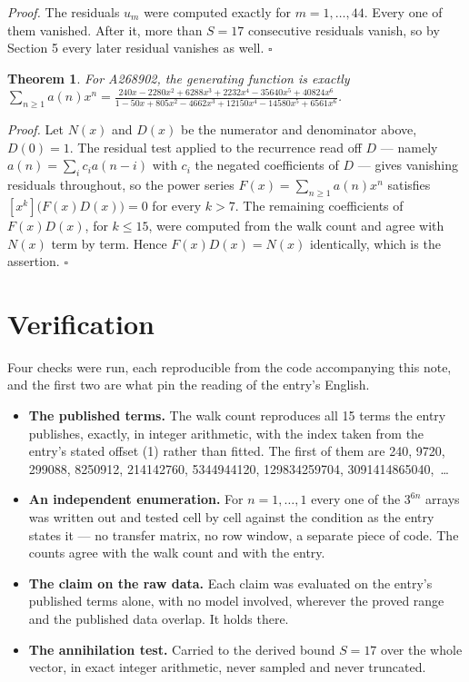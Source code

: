 \documentclass[11pt]{article}
\newtheorem{theorem}{Theorem}
\theoremstyle{definition}
\begin{document}
{\itshape Proof.} The residuals $u_m$ were computed exactly for $m = 1,\dots,44$. Every one of them vanished. After it, more than $S = 17$ consecutive residuals vanish, so by Section 5 every later residual vanishes as well. $\square$

\begin{theorem} For A268902, the generating function is exactly $\sum_{n\ge 1} a(n)x^n = \frac{240x - 2280x^{2} + 6288x^{3} + 2232x^{4} - 35640x^{5} + 40824x^{6}}{1 - 50x + 805x^{2} - 4662x^{3} + 12150x^{4} - 14580x^{5} + 6561x^{6}}$.\end{theorem}

{\itshape Proof.} Let $N(x)$ and $D(x)$ be the numerator and denominator above, $D(0)=1$. The residual test applied to the recurrence read off $D$ --- namely $a(n) = \sum_i c_i a(n-i)$ with $c_i$ the negated coefficients of $D$ --- gives vanishing residuals throughout, so the power series $F(x)=\sum_{n\ge 1}a(n)x^n$ satisfies $[x^k]\bigl(F(x)D(x)\bigr) = 0$ for every $k > 7$. The remaining coefficients of $F(x)D(x)$, for $k \le 15$, were computed from the walk count and agree with $N(x)$ term by term. Hence $F(x)D(x) = N(x)$ identically, which is the assertion. $\square$

\section{Verification}

Four checks were run, each reproducible from the code accompanying this note, and the first two are what pin the reading of the entry's English.

\begin{itemize}

\item {\bfseries The published terms.} The walk count reproduces all 15 terms the entry publishes, exactly, in integer arithmetic, with the index taken from the entry's stated offset (1) rather than fitted. The first of them are 240, 9720, 299088, 8250912, 214142760, 5344944120, 129834259704, 3091414865040,~\dots

\item {\bfseries An independent enumeration.} For $n = 1,\dots,1$ every one of the $3^{6n}$ arrays was written out and tested cell by cell against the condition as the entry states it --- no transfer matrix, no row window, a separate piece of code. The counts agree with the walk count and with the entry.

\item {\bfseries The claim on the raw data.} Each claim was evaluated on the entry's published terms alone, with no model involved, wherever the proved range and the published data overlap. It holds there.

\item {\bfseries The annihilation test.} Carried to the derived bound $S = 17$ over the whole vector, in exact integer arithmetic, never sampled and never truncated.

\end{itemize}
\end{document}
